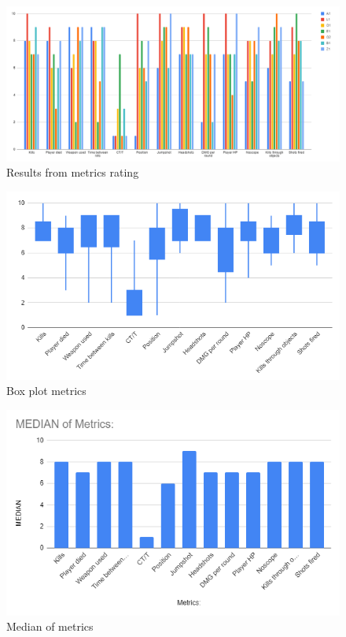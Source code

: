     \begin{figure}[H]
        \centering
        \includegraphics[width=17cm]{Images/All_results.png}
        \caption{Results from metrics rating}
        \label{fig:Barchart}
    \end{figure}
    \begin{figure}[H]
        \centering
        \includegraphics[width=17cm]{Images/boxplot.png}
        \caption{Box plot metrics}
        \label{fig:BoxplotMetrics}
    \end{figure}
    \begin{figure}[H]
        \centering
        \includegraphics[width=17cm]{Images/medianMetrics.png}
        \caption{Median of metrics}
        \label{fig:medianMetrics}
    \end{figure}
